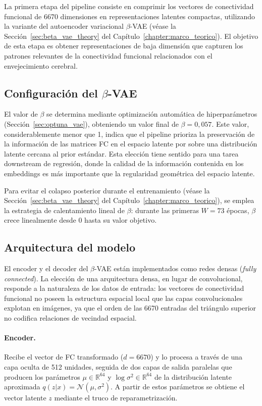 La primera etapa del pipeline consiste en comprimir los vectores de conectividad funcional de 6670 dimensiones en representaciones latentes compactas, utilizando la variante del autoencoder variacional $\beta$-VAE (véase la Sección~\ref{sec:beta_vae_theory} del Capítulo~\ref{chapter:marco_teorico}). El objetivo de esta etapa es obtener representaciones de baja dimensión que capturen los patrones relevantes de la conectividad funcional relacionados con el envejecimiento cerebral.

\subsection{Configuración del $\beta$-VAE}

El valor de $\beta$ se determina mediante optimización automática de hiperparámetros (Sección~\ref{sec:optuna_vae}), obteniendo un valor final de $\beta = 0{,}057$. Este valor, considerablemente menor que 1, indica que el pipeline prioriza la preservación de la información de las matrices FC en el espacio latente por sobre una distribución latente cercana al prior estándar. Esta elección tiene sentido para una tarea downstream de regresión, donde la calidad de la información contenida en los embeddings es más importante que la regularidad geométrica del espacio latente.

Para evitar el colapso posterior durante el entrenamiento (véase la Sección~\ref{sec:beta_vae_theory} del Capítulo~\ref{chapter:marco_teorico}), se emplea la estrategia de calentamiento lineal de $\beta$: durante las primeras $W = 73$ épocas, $\beta$ crece linealmente desde 0 hasta su valor objetivo.

\subsection{Arquitectura del modelo}
\label{sec:vae_architecture}

El encoder y el decoder del $\beta$-VAE están implementados como redes densas (\textit{fully connected}). La elección de una arquitectura densa, en lugar de convolucional, responde a la naturaleza de los datos de entrada: los vectores de conectividad funcional no poseen la estructura espacial local que las capas convolucionales explotan en imágenes, ya que el orden de las 6670 entradas del triángulo superior no codifica relaciones de vecindad espacial.

\paragraph{Encoder.} Recibe el vector de FC transformado ($d = 6670$) y lo procesa a través de una capa oculta de 512 unidades, seguida de dos capas de salida paralelas que producen los parámetros $\mu \in \mathbb{R}^{64}$ y $\log \sigma^2 \in \mathbb{R}^{64}$ de la distribución latente aproximada $q(z|x) = \mathcal{N}(\mu, \sigma^2)$. A partir de estos parámetros se obtiene el vector latente $z$ mediante el truco de reparametrización.

